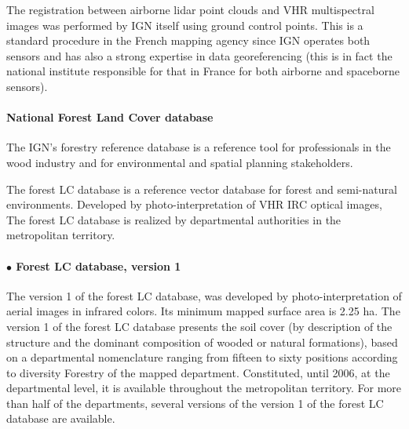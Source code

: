 The registration between airborne lidar point clouds and VHR multispectral images was performed by IGN itself using ground control points. This is a standard procedure in the French mapping agency since IGN operates both sensors and has also a strong expertise in data georeferencing (this is in fact the national institute responsible for that in France for both airborne and spaceborne sensors). \\

\paragraph{National Forest Land Cover database \\}
The IGN's forestry reference database is a reference tool for professionals in the wood industry and for environmental and spatial planning stakeholders.

The forest LC database is a reference vector database for forest and semi-natural environments. Developed by photo-interpretation of VHR IRC optical images, The forest LC database is realized by departmental authorities in the metropolitan territory.

\paragraph{$\bullet$ Forest LC database, version 1 \\}
The version 1 of the forest LC database, was developed by photo-interpretation of aerial images in infrared colors.
Its minimum mapped surface area is 2.25 ha.
The version 1 of the forest LC database presents the soil cover (by description of the structure and the dominant composition of wooded or natural formations), based on a departmental nomenclature ranging from fifteen to sixty positions according to diversity Forestry of the mapped department.
Constituted, until 2006, at the departmental level, it is available throughout the metropolitan territory.
For more than half of the departments, several versions of the version 1 of the forest LC database are available.

